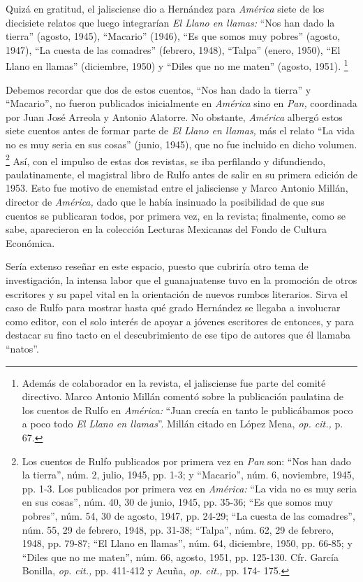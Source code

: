 \documentclass[14pt,twoside,final]{extbook} %
\let\oldfootnote\footnote
\renewcommand\footnote[1]{%
\oldfootnote{\hspace{1mm}#1}}
\begin{document}
Quizá en gratitud, el jalisciense dio a Hernández para \emph{América} siete de los diecisiete relatos que luego integrarían \emph{El Llano en llamas:} ``Nos han dado la tierra'' (agosto, 1945), ``Macario'' (1946), ``Es que somos muy pobres'' (agosto, 1947), ``La cuesta de las comadres'' (febrero, 1948), ``Talpa'' (enero, 1950), ``El Llano en llamas'' (diciembre, 1950) y ``Diles que no me maten'' (agosto, 1951).\footnote{Además de colaborador en la revista, el jalisciense fue parte del comité directivo. Marco Antonio Millán comentó sobre la publicación paulatina de los cuentos de Rulfo en \emph{América:} ``Juan crecía en tanto le publicábamos poco a poco todo \emph{El Llano en llamas}''. Millán citado en López Mena, \emph{op. cit.,} p. 67.}

Debemos recordar que dos de estos cuentos, ``Nos han dado la tierra'' y ``Macario'', no fueron publicados inicialmente en \emph{América} sino en \emph{Pan,} coordinada por Juan José Arreola y Antonio Alatorre. No obstante, \emph{América} albergó estos siete cuentos antes de formar parte de \emph{El Llano en llamas,} más el relato ``La vida no es muy seria en sus cosas'' (junio, 1945), que no fue incluido en dicho volumen.\footnote{Los cuentos de Rulfo publicados por primera vez en \emph{Pan} son: ``Nos han dado la tierra'', núm. 2, julio, 1945, pp. 1-3; y ``Macario'', núm. 6, noviembre, 1945, pp. 1-3. Los publicados por primera vez en \emph{América:} ``La vida no es muy seria en sus cosas'', núm. 40, 30 de junio, 1945, pp. 35-36; ``Es que somos muy pobres'', núm. 54, 30 de agosto, 1947, pp. 24-29; ``La cuesta de las comadres'', núm. 55, 29 de febrero, 1948, pp. 31-38; ``Talpa'', núm. 62, 29 de febrero, 1948, pp. 79-87; ``El Llano en llamas'', núm. 64, diciembre, 1950, pp. 66-85; y ``Diles que no me maten'', núm. 66, agosto, 1951, pp. 125-130. Cfr. García Bonilla, \emph{op. cit.,} pp. 411-412 y Acuña, \emph{op. cit.,} pp. 174- 175.} Así, con el impulso de estas dos revistas, se iba perfilando y difundiendo, paulatinamente, el magistral libro de Rulfo antes de salir en su primera edición de 1953. Esto fue motivo de enemistad entre el jalisciense y Marco Antonio Millán, director de \emph{América,} dado que le había insinuado la posibilidad de que sus cuentos se publicaran todos, por primera vez, en la revista; finalmente, como se sabe, aparecieron en la colección Lecturas Mexicanas del Fondo de Cultura Económica.

Sería extenso reseñar en este espacio, puesto que cubriría otro tema de investigación, la intensa labor que el guanajuatense tuvo en la promoción de otros escritores y su papel vital en la orientación de nuevos rumbos literarios. Sirva el caso de Rulfo para mostrar hasta qué grado Hernández se llegaba a involucrar como editor, con el solo interés de apoyar a jóvenes escritores de entonces, y para destacar su fino tacto en el descubrimiento de ese tipo de autores que él llamaba ``natos''.
\end{document}
